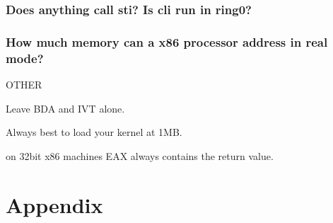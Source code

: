 \documentclass[oneside,english,final]{amsbook}
\begin{document}
\section{Does anything call sti? Is cli run in ring0?}

\section{How much memory can a x86 processor address in real mode?}


OTHER

Leave BDA and IVT alone.

Always best to load your kernel at 1MB.


on 32bit x86 machines EAX always contains the return value.

\appendix
\part{Appendix}


\nocite{*}


\printglossaries

\listoffigures
\listoftables
\end{document}
